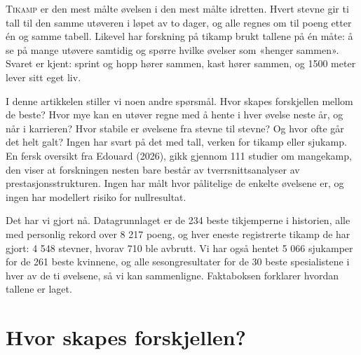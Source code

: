 
\lettrine[lines=3]{T}{ikamp} er den mest målte øvelsen i den mest målte idretten. Hvert stevne gir ti tall til den samme utøveren i løpet av to dager, og alle regnes om til poeng etter én og samme tabell. Likevel har forskning på tikamp brukt tallene på én måte: å se på mange utøvere samtidig og spørre hvilke øvelser som «henger sammen». Svaret er kjent: sprint og hopp hører sammen, kast hører sammen, og 1500 meter lever sitt eget liv.

I denne artikkelen stiller vi noen andre spørsmål. Hvor skapes forskjellen mellom de beste? Hvor mye kan en utøver regne med å hente i hver øvelse neste år, og når i karrieren? Hvor stabile er øvelsene fra stevne til stevne? Og hvor ofte går det helt galt? Ingen har svart på det med tall, verken for tikamp eller sjukamp. En fersk oversikt fra Edouard (2026), gikk gjennom 111 studier om mangekamp, den viser at forskningen nesten bare består av tverrsnittsanalyser av prestasjonsstrukturen. Ingen har målt hvor pålitelige de enkelte øvelsene er, og ingen har modellert risiko for nullresultat.

Det har vi gjort nå. Datagrunnlaget er de 234 beste tikjemperne i historien, alle med personlig rekord over 8 217 poeng, og hver eneste registrerte tikamp de har gjort: 4 548 stevner, hvorav 710 ble avbrutt. Vi har også hentet 5 066 sjukamper for de 261 beste kvinnene, og alle sesongresultater for de 30 beste spesialistene i hver av de ti øvelsene, så vi kan sammenligne. Faktaboksen forklarer hvordan tallene er laget.

\section{Hvor skapes forskjellen?}\label{hvor-skapes-forskjellen}


